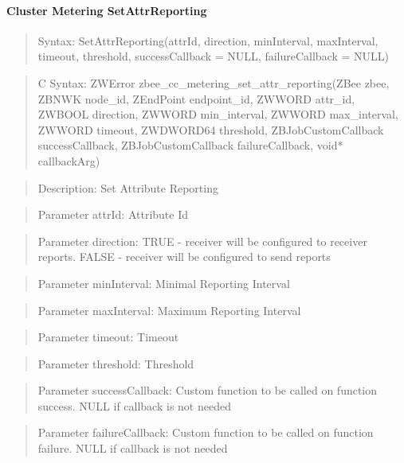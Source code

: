 \paragraph{Cluster Metering SetAttrReporting}
\begin{quote}Syntax: SetAttrReporting(attrId, direction, minInterval, maxInterval, timeout, threshold, successCallback = NULL, failureCallback = NULL)\end{quote}
\begin{quote}C Syntax: ZWError zbee\_cc\_metering\_set\_attr\_reporting(ZBee zbee, ZBNWK node\_id, ZEndPoint endpoint\_id, ZWWORD attr\_id, ZWBOOL direction, ZWWORD min\_interval, ZWWORD max\_interval, ZWWORD timeout, ZWDWORD64 threshold, ZBJobCustomCallback successCallback, ZBJobCustomCallback failureCallback, void* callbackArg)\end{quote}
\begin{quote}Description: Set Attribute Reporting\end{quote}
\begin{quote}Parameter attrId: Attribute Id\end{quote}
\begin{quote}Parameter direction: TRUE  - receiver will be configured to receiver reports. FALSE - receiver will be configured to send reports\end{quote}
\begin{quote}Parameter minInterval: Minimal Reporting Interval\end{quote}
\begin{quote}Parameter maxInterval: Maximum Reporting Interval\end{quote}
\begin{quote}Parameter timeout: Timeout\end{quote}
\begin{quote}Parameter threshold: Threshold\end{quote}
\begin{quote}Parameter successCallback: Custom function to be called on function success. NULL if callback is not needed\end{quote}
\begin{quote}Parameter failureCallback: Custom function to be called on function failure. NULL if callback is not needed\end{quote}


